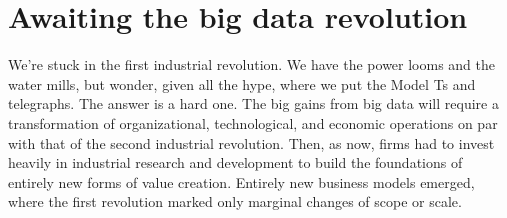 \documentclass[12pt]{article}
\begin{document}






\section{Awaiting the big data revolution}
\label{sec:awaiting-big-data}

We're stuck in the first industrial revolution. We have the power
looms and the water mills, but wonder, given all the hype, where we put the Model Ts and
telegraphs. The answer is a hard one. The big gains from big data will
require a transformation of organizational, technological, and
economic operations on par with that of the second industrial
revolution. Then, as now, firms had to invest heavily in industrial
research and development to build the foundations of entirely new
forms of value creation. Entirely new business models emerged, where
the first revolution marked only marginal changes of scope or scale. 
\end{document}
